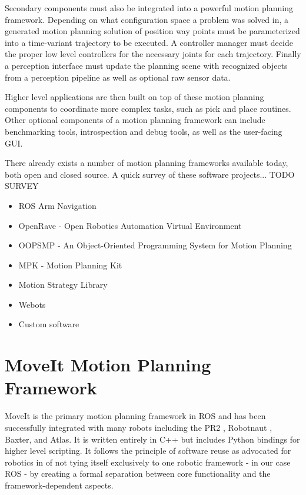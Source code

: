\documentclass[10pt,journal,compsoc]{joser1}
\begin{document}
{Secondary components must also be integrated into a powerful motion planning framework. Depending on what configuration space a problem was solved in, a generated motion planning solution of position way points must be parameterized into a time-variant trajectory to be executed. A controller manager must decide the proper low level controllers for the necessary joints for each trajectory. Finally a perception interface must update the planning scene with recognized objects from a perception pipeline as well as optional raw sensor data.

Higher level applications are then built on top of these motion planning components to coordinate more complex tasks, such as pick and place routines. Other optional components of a motion planning framework can include benchmarking tools, introspection and debug tools, as well as the user-facing GUI.

There already exists a number of motion planning frameworks available today, both open and closed source. A quick survey of these software projects... TODO SURVEY

\begin{itemize}
    \item ROS Arm Navigation
    \item OpenRave - Open Robotics Automation Virtual Environment
    \item OOPSMP - An Object-Oriented Programming System for Motion Planning
    \item MPK - Motion Planning Kit
    \item Motion Strategy Library
    \item Webots
    \item Custom software
\end{itemize}

\section{MoveIt Motion Planning Framework}
\label{sec::moveit}

MoveIt is the primary motion planning framework in ROS and has been successfully integrated with many robots including the PR2 \cite{wyrobek2008towards}, Robotnaut \cite{ambrose2000robonaut}, Baxter, and Atlas. It is written entirely in C++ but includes Python bindings for higher level scripting. It follows the principle of software reuse as advocated for robotics in \cite{makarenko2007benefits} of not tying itself exclusively to one robotic framework - in our case ROS - by creating a formal separation between core functionality and the framework-dependent aspects. 

}
\end{document}
